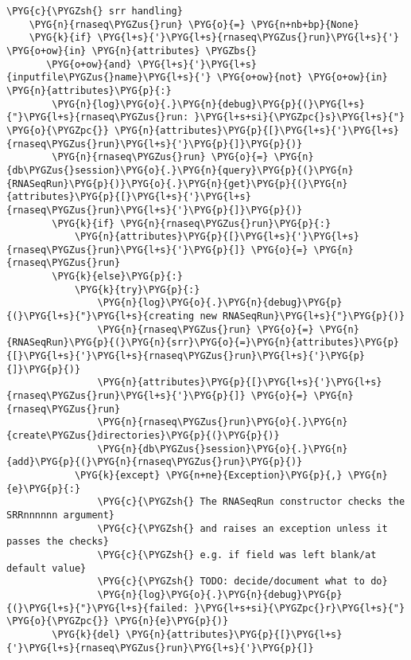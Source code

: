 \begin{Verbatim}[commandchars=\\\{\}]
    \PYG{c}{\PYGZsh{} srr handling}
    \PYG{n}{rnaseq\PYGZus{}run} \PYG{o}{=} \PYG{n+nb+bp}{None}
    \PYG{k}{if} \PYG{l+s}{'}\PYG{l+s}{rnaseq\PYGZus{}run}\PYG{l+s}{'} \PYG{o+ow}{in} \PYG{n}{attributes} \PYGZbs{}
       \PYG{o+ow}{and} \PYG{l+s}{'}\PYG{l+s}{inputfile\PYGZus{}name}\PYG{l+s}{'} \PYG{o+ow}{not} \PYG{o+ow}{in} \PYG{n}{attributes}\PYG{p}{:}
        \PYG{n}{log}\PYG{o}{.}\PYG{n}{debug}\PYG{p}{(}\PYG{l+s}{"}\PYG{l+s}{rnaseq\PYGZus{}run: }\PYG{l+s+si}{\PYGZpc{}s}\PYG{l+s}{"} \PYG{o}{\PYGZpc{}} \PYG{n}{attributes}\PYG{p}{[}\PYG{l+s}{'}\PYG{l+s}{rnaseq\PYGZus{}run}\PYG{l+s}{'}\PYG{p}{]}\PYG{p}{)}
        \PYG{n}{rnaseq\PYGZus{}run} \PYG{o}{=} \PYG{n}{db\PYGZus{}session}\PYG{o}{.}\PYG{n}{query}\PYG{p}{(}\PYG{n}{RNASeqRun}\PYG{p}{)}\PYG{o}{.}\PYG{n}{get}\PYG{p}{(}\PYG{n}{attributes}\PYG{p}{[}\PYG{l+s}{'}\PYG{l+s}{rnaseq\PYGZus{}run}\PYG{l+s}{'}\PYG{p}{]}\PYG{p}{)}
        \PYG{k}{if} \PYG{n}{rnaseq\PYGZus{}run}\PYG{p}{:}
            \PYG{n}{attributes}\PYG{p}{[}\PYG{l+s}{'}\PYG{l+s}{rnaseq\PYGZus{}run}\PYG{l+s}{'}\PYG{p}{]} \PYG{o}{=} \PYG{n}{rnaseq\PYGZus{}run}
        \PYG{k}{else}\PYG{p}{:}
            \PYG{k}{try}\PYG{p}{:}
                \PYG{n}{log}\PYG{o}{.}\PYG{n}{debug}\PYG{p}{(}\PYG{l+s}{"}\PYG{l+s}{creating new RNASeqRun}\PYG{l+s}{"}\PYG{p}{)}
                \PYG{n}{rnaseq\PYGZus{}run} \PYG{o}{=} \PYG{n}{RNASeqRun}\PYG{p}{(}\PYG{n}{srr}\PYG{o}{=}\PYG{n}{attributes}\PYG{p}{[}\PYG{l+s}{'}\PYG{l+s}{rnaseq\PYGZus{}run}\PYG{l+s}{'}\PYG{p}{]}\PYG{p}{)}
                \PYG{n}{attributes}\PYG{p}{[}\PYG{l+s}{'}\PYG{l+s}{rnaseq\PYGZus{}run}\PYG{l+s}{'}\PYG{p}{]} \PYG{o}{=} \PYG{n}{rnaseq\PYGZus{}run}
                \PYG{n}{rnaseq\PYGZus{}run}\PYG{o}{.}\PYG{n}{create\PYGZus{}directories}\PYG{p}{(}\PYG{p}{)}
                \PYG{n}{db\PYGZus{}session}\PYG{o}{.}\PYG{n}{add}\PYG{p}{(}\PYG{n}{rnaseq\PYGZus{}run}\PYG{p}{)}
            \PYG{k}{except} \PYG{n+ne}{Exception}\PYG{p}{,} \PYG{n}{e}\PYG{p}{:}
                \PYG{c}{\PYGZsh{} The RNASeqRun constructor checks the SRRnnnnnn argument}
                \PYG{c}{\PYGZsh{} and raises an exception unless it passes the checks}
                \PYG{c}{\PYGZsh{} e.g. if field was left blank/at default value}
                \PYG{c}{\PYGZsh{} TODO: decide/document what to do}
                \PYG{n}{log}\PYG{o}{.}\PYG{n}{debug}\PYG{p}{(}\PYG{l+s}{"}\PYG{l+s}{failed: }\PYG{l+s+si}{\PYGZpc{}r}\PYG{l+s}{"} \PYG{o}{\PYGZpc{}} \PYG{n}{e}\PYG{p}{)}
        \PYG{k}{del} \PYG{n}{attributes}\PYG{p}{[}\PYG{l+s}{'}\PYG{l+s}{rnaseq\PYGZus{}run}\PYG{l+s}{'}\PYG{p}{]}


\end{Verbatim}
